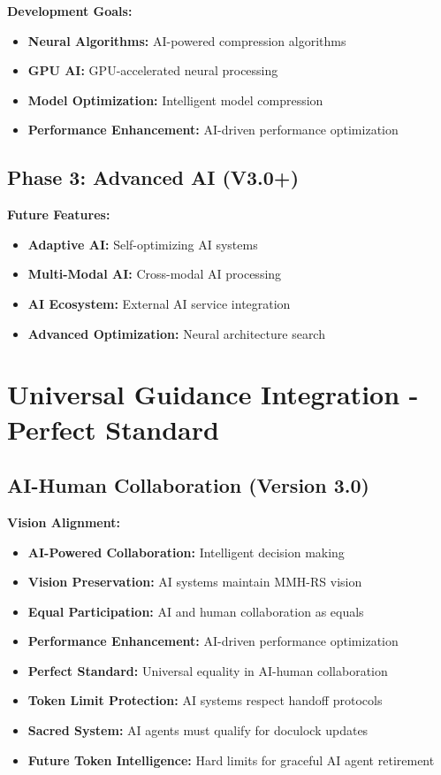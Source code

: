 \documentclass[12pt,a4paper]{article}
\begin{document}
\textbf{Development Goals:}
\begin{itemize}
    \item \textbf{Neural Algorithms:} AI-powered compression algorithms
    \item \textbf{GPU AI:} GPU-accelerated neural processing
    \item \textbf{Model Optimization:} Intelligent model compression
    \item \textbf{Performance Enhancement:} AI-driven performance optimization
\end{itemize}

\subsection{Phase 3: Advanced AI (V3.0+)}

\textbf{Future Features:}
\begin{itemize}
    \item \textbf{Adaptive AI:} Self-optimizing AI systems
    \item \textbf{Multi-Modal AI:} Cross-modal AI processing
    \item \textbf{AI Ecosystem:} External AI service integration
    \item \textbf{Advanced Optimization:} Neural architecture search
\end{itemize}

\section{Universal Guidance Integration - Perfect Standard}

\subsection{AI-Human Collaboration (Version 3.0)}

\textbf{Vision Alignment:}
\begin{itemize}
    \item \textbf{AI-Powered Collaboration:} Intelligent decision making
    \item \textbf{Vision Preservation:} AI systems maintain MMH-RS vision
    \item \textbf{Equal Participation:} AI and human collaboration as equals
    \item \textbf{Performance Enhancement:} AI-driven performance optimization
    \item \textbf{Perfect Standard:} Universal equality in AI-human collaboration
    \item \textbf{Token Limit Protection:} AI systems respect handoff protocols
    \item \textbf{Sacred System:} AI agents must qualify for doculock updates
    \item \textbf{Future Token Intelligence:} Hard limits for graceful AI agent retirement
\end{itemize}
\end{document}
